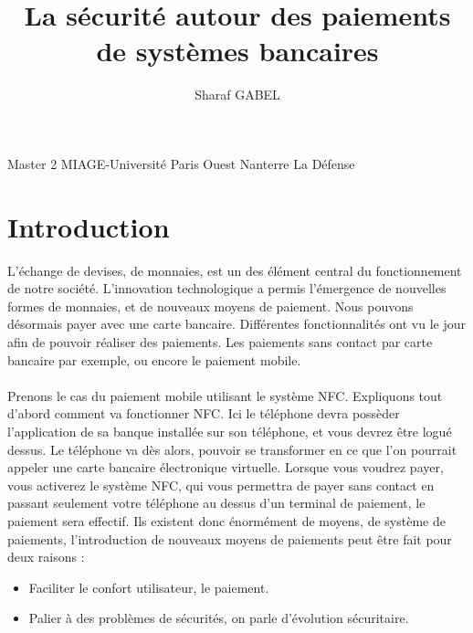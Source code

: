 \documentclass{article}
\begin{document}
\title{\vspace*{\fill}La sécurité autour des paiements de systèmes bancaires}

\maketitle
\bigskip
\bigskip
\bigskip
\bigskip
\bigskip
\bigskip
\bigskip
\bigskip
\bigskip
\bigskip
\bigskip
\bigskip
\bigskip
\bigskip
\bigskip
\bigskip

\begin{center}
\author{Sharaf GABEL} 
\end{center}

\bigskip
\begin{center}
Master 2 MIAGE-Université Paris Ouest Nanterre La Défense
\end{center}

\newpage
\tableofcontents
\newpage
\section{Introduction}
\bigskip
L’échange de devises, de monnaies, est un des élément central du fonctionnement de notre société. L’innovation technologique a permis l'émergence de nouvelles formes de monnaies, et de nouveaux moyens de paiement. Nous pouvons désormais payer avec une carte bancaire. Différentes fonctionnalités ont vu le jour afin de pouvoir réaliser des paiements. Les paiements sans contact par carte bancaire par exemple, ou encore le paiement mobile.

\paragraph{}
Prenons le cas du paiement mobile utilisant le système NFC. Expliquons tout d’abord comment va fonctionner NFC. Ici le téléphone devra possèder l’application de sa banque installée sur son téléphone, et vous devrez être logué dessus. Le téléphone va dès alors, pouvoir se transformer en ce que l’on pourrait appeler une carte bancaire électronique virtuelle. Lorsque vous voudrez payer, vous activerez le système NFC, qui vous permettra de payer sans contact en passant seulement votre téléphone au dessus d’un terminal de paiement, le paiement sera effectif. Ils existent donc énormément de moyens, de système de paiements, l’introduction de nouveaux moyens de paiements peut être fait pour deux raisons : 

\begin{itemize}
\item Faciliter le confort utilisateur, le paiement.
\item Palier à des problèmes de sécurités, on parle d'évolution sécuritaire.
\end{itemize}
\end{document}

